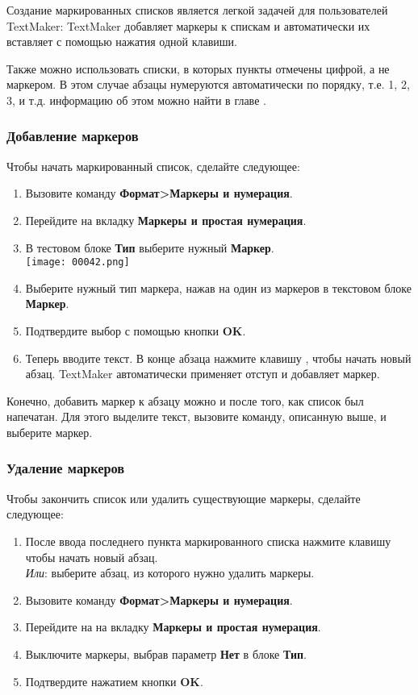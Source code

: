 ﻿\documentclass[a4paper,10pt]{article}
\begin{document}
Создание маркированных списков является легкой задачей для пользователей TextMaker: TextMaker добавляет маркеры к спискам и автоматически их вставляет с помощью нажатия одной клавиши.

 Также можно использовать списки, в которых пункты отмечены цифрой, а не маркером. В этом случае абзацы нумеруются автоматически по порядку, т.е. 1, 2, 3, и т.д.  информацию об этом можно найти в главе .

\subsubsection{Добавление маркеров}
Чтобы начать маркированный список, сделайте следующее:
\begin{enumerate}
 \item Вызовите команду \textbf{Формат>Маркеры и нумерация}.
 \item Перейдите на вкладку \textbf{Маркеры и простая нумерация}.
 \item В тестовом блоке \textbf{Тип} выберите нужный \textbf{Маркер}.\\
 \texttt{[image: 00042.png]}
 \item Выберите нужный тип маркера, нажав на один из маркеров в текстовом блоке \textbf{Маркер}.
 \item Подтвердите выбор с помощью кнопки \textbf{OK}.
 \item Теперь вводите текст. В конце абзаца нажмите клавишу , чтобы начать новый абзац. TextMaker автоматически применяет отступ и добавляет маркер.
\end{enumerate}

Конечно, добавить маркер к абзацу можно и после того, как список был напечатан. Для этого выделите текст, вызовите команду, описанную выше, и выберите маркер.

\subsubsection{Удаление маркеров}
Чтобы закончить список или удалить существующие маркеры, сделайте следующее:
\begin{enumerate}
 \item После ввода последнего пункта маркированного списка нажмите клавишу  чтобы начать новый абзац.\\
 \textit{Или}: выберите абзац, из которого нужно удалить маркеры.
 \item Вызовите команду \textbf{Формат>Маркеры и нумерация}.
 \item Перейдите на на вкладку \textbf{Маркеры и простая нумерация}. 
 \item Выключите маркеры, выбрав параметр \textbf{Нет} в блоке \textbf{Тип}.
 \item Подтвердите нажатием кнопки \textbf{OK}.
\end{enumerate}
\end{document}
